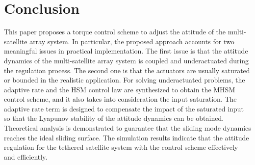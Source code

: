 \section{Conclusion}\label{sec:Conclusion}
This paper proposes a torque control scheme to adjust the attitude of the multi-satellite array system. In particular, the proposed approach accounts for two meaningful issues in practical implementation. The first issue is that the attitude dynamics of the multi-satellite array system is coupled and underactuated during the regulation process. The second one is that the actuators are usually saturated or bounded in the realistic application. For solving underactuated problems, the adaptive rate and the HSM control law are synthesized to obtain the MHSM control scheme, and it also takes into consideration the input saturation. The adaptive rate term is designed to compensate the impact of the saturated input so that the Lyapunov stability of the attitude dynamics can be obtained. Theoretical analysis is demonstrated to guarantee that the sliding mode dynamics reaches the ideal sliding surface. The simulation results indicate that the attitude regulation for the tethered satellite system with the control scheme effectively and efficiently.
%



